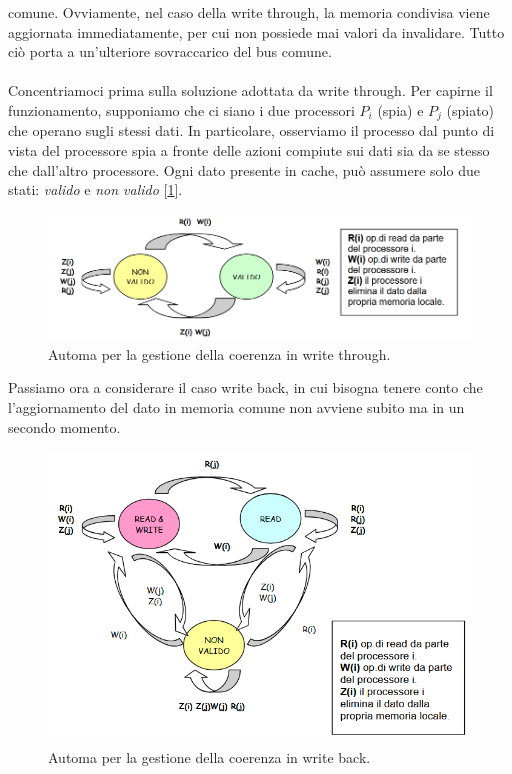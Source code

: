 comune. Ovviamente, nel caso della write through, la memoria condivisa viene aggiornata immediatamente, per cui non possiede mai valori da invalidare. Tutto ciò porta a un'ulteriore sovraccarico del bus comune.
\\
\\
Concentriamoci prima sulla soluzione adottata da write through. Per capirne il funzionamento, supponiamo che ci siano i due processori \(P_i\) (spia) e \(P_j\) (spiato) che operano sugli stessi dati. In particolare, osserviamo il processo dal punto di vista del processore spia a fronte delle azioni compiute sui dati sia da se stesso che dall'altro processore. Ogni dato presente in cache, può assumere solo due stati: \textit{valido} e \textit{non valido} [\ref{fig:automa-wt}].
\begin{figure}[!h]
    \centering
    \includegraphics[width=0.7\linewidth]{img/automa_wt.png}
    \caption{Automa per la gestione della coerenza in write through.}
    \label{fig:automa-wt}
\end{figure}
Passiamo ora a considerare il caso write back, in cui bisogna tenere conto che l'aggiornamento del dato in
memoria comune non avviene subito ma in un secondo momento.  
\begin{figure}[!h]
    \centering
    \includegraphics[width=0.55\linewidth]{img/automa-wb.png}
    \caption{Automa per la gestione della coerenza in write back.}
    \label{fig:automa-wb}
\end{figure}

